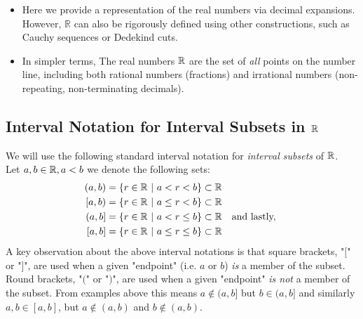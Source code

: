 \begin{itemize}
{    Notably, $0.5$—which is not uniquely represented in base $10$—has a unique ternary representation: $0.111\ldots$ Using the geometric series formula $\sum_{n=0}^\infty ar^n = \frac{a}{1-r}$ with $a=1$ and $r=\frac{1}{3}$, $0.111\ldots = \frac{3}{2} - 1 = \frac{1}{2}$ (we subtract $1=ar^0$ because our number is $\sum_{n=1}^\infty ar^n$). Conversely, $1/3$ lacks a unique 
    ternary form: it could be $0.1000$ or $0.0222\ldots$, whereas in decimal, $0.333\ldots$ is unique.}
    \item Here we provide a representation of the real numbers via decimal expansions. However, $\mathbb{R}$ can also be rigorously defined using other constructions, such as Cauchy sequences or Dedekind cuts.
    \item In simpler terms, The real numbers ${\mathbb{R}}$ are the set of \textit{all} points on the number line, including both rational numbers (fractions) and irrational numbers (non-repeating, non-terminating decimals).
\end{itemize}
\subsection{Interval Notation for Interval Subsets in ${\mathbb{R}}$}
We will use the following standard interval notation for \textit{interval subsets} of ${\mathbb{R}}$.\\ 
Let $a,b\in {\mathbb{R}}, a<b$ we denote the following sets:
\begin{align}
    (a,b)&= \{r\in \R \ | \ a<r<b \} \subset \R \nonumber \\
    [a,b)&= \{r\in \R \ | \ a\leq r<b \} \subset \R \nonumber \\
    (a,b]&= \{r\in \R \ | \ a< r\leq b \} \subset \R \quad \text{and lastly, } \nonumber \\
    [a,b]&= \{r\in \R \ | \ a\leq r \leq b \} \subset \R \nonumber
\end{align}
\noindent A key observation about the above interval notations is that square brackets, "$[$" or "$]$", are used when a given "endpoint" (i.e. $a$ or $b$) \textit{is} a member of the subset. Round brackets, "$($" or "$)$", are used when a given "endpoint" \textit{is not} a member of the subset. From examples above this means $a\not \in (a,b]$ but $b\in (a,b]$ and similarly $a,b\in [a,b]$, but $a\not \in (a,b)$ and $b \not \in (a,b)$.
\newpage

